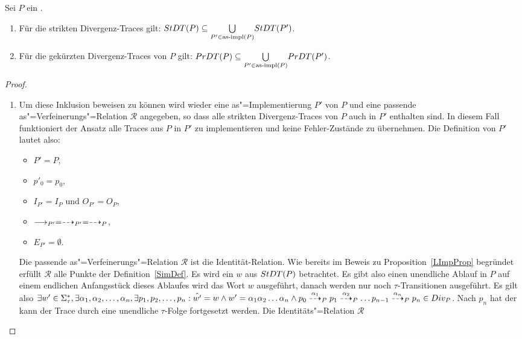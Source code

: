 \begin{Prop}
  \label{DivTraceProp}
  Sei $P$ ein \MEIO{}.
  \begin{enumerate}
    \item Für die strikten Divergenz-Traces gilt: $StDT (P) \subseteq
      \underset{P'\in\mathrm{as}\text{-}\mathrm{impl} (P)}{\bigcup} StDT (P')$.
    \item Für die gekürzten Divergenz-Traces von $P$ gilt:
      $PrDT (P) \subseteq \underset{P'\in\mathrm{as}\text{-}\mathrm{impl} (P)}{\bigcup} PrDT (P')$.
  \end{enumerate}
\end{Prop}
\begin{proof}\mbox{}
  \begin{enumerate}
    \item Um diese Inklusion beweisen zu können wird wieder eine
      as"=Implementierung $P'$ von $P$ und eine passende
      as"=Verfeinerungs"=Relation $\mathcal{R}$ angegeben, so dass alle
      strikten Divergenz-Traces von $P$ auch in $P'$ enthalten sind. In diesem
      Fall funktioniert der Ansatz alle Traces aus $P$ in $P'$ zu
      implementieren und keine Fehler-Zustände zu übernehmen. Die Definition
      von $P'$ lautet also:
      \begin{itemize}
        \item $P'=P$,
        \item $p'_0=p_0$,
        \item $I_{P'}=I_P$ und $O_{P'}=O_P$,
        \item $\must _{P'} =\may _{P'} = \may _P$,
        \item $E_{P'}=\emptyset$.
      \end{itemize}
      Die passende as"=Verfeinerungs"=Relation $\mathcal{R}$ ist die
      Identität-Relation. Wie bereits im Beweis zu Proposition~\ref{LImpProp}
      begründet erfüllt $\mathcal{R}$ alle Punkte der Definition~\ref{SimDef}.
      Es wird ein $w$ aus $StDT (P)$ betrachtet. Es gibt also einen unendliche
      Ablauf in $P$ auf einem endlichen Anfangsstück dieses Ablaufes wird das
      Wort $w$ ausgeführt, danach werden nur noch $\tau$-Transitionen
      ausgeführt. Es gilt also $\exists w' \in \Sigma _{\tau}^*, \exists
      \alpha _1, \alpha _2, \dots , \alpha _n, \exists p_1, p_2, \dots , p_n:
      \hat{w'} = w \land w' = \alpha _1\alpha _2\dots\alpha _n \land p_0
      \may[\alpha _1]_P p_1 \may[\alpha _2]_P \dots p_{n-1} \may[\alpha _n]_P
      p_n \in Div _P$. Nach $p_n$ hat der kann der Trace durch eine unendliche
      $\tau$-Folge fortgesetzt werden. Die Identitäts"=Relation $\mathcal{R}$

\end{enumerate}
\end{proof}
